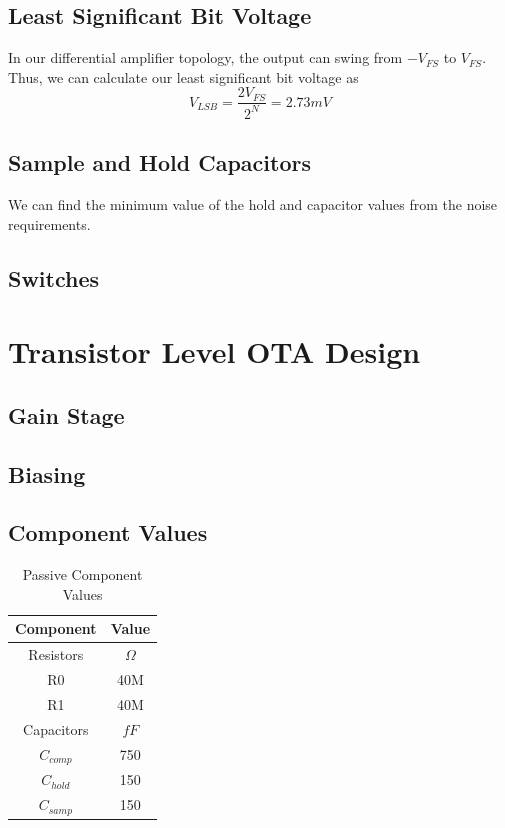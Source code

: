 \documentclass[journal]{IEEEtran}
\begin{document}
\subsection{Least Significant Bit Voltage}
In our differential amplifier topology, the output can swing from $-V_{FS}$ to $V_{FS}$. Thus, we can calculate our least significant bit voltage as
\begin{equation}
V_{LSB}=\frac{2V_{FS}}{2^N}=2.73mV
\end{equation}

\subsection{Sample and Hold Capacitors}
We can find the minimum value of the hold and capacitor values from the noise requirements.


\subsection{Switches}

\section{Transistor Level OTA Design}
\subsection{Gain Stage}

\subsection{Biasing}

\subsection{Component Values}

\begin{table}
\centering
\caption{Passive Component Values}
\label{tab:passive_elements}
\begin{tabular}{|c|c|}
\hline Component & Value \\ 
\hline Resistors & $\Omega$ \\ 
\hline R0 & 40M \\ 
\hline R1 & 40M \\ 
\hline Capacitors & $fF$ \\ 
\hline $C_{comp}$ & 750 \\ 
\hline $C_{hold}$ & 150 \\ 
\hline $C_{samp}$ & 150 \\ 
\hline 
\end{tabular} 
\end{table}
\end{document}
